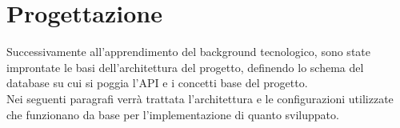 \chapter{Progettazione}
\label{cap:progettazione}

Successivamente all'apprendimento del background tecnologico, sono state improntate le basi dell'architettura del progetto, definendo lo schema del database su cui si poggia l'API e i concetti base del progetto.\\
Nei seguenti paragrafi verrà trattata l'architettura e le configurazioni utilizzate che funzionano da base per l'implementazione di quanto sviluppato.\\


















